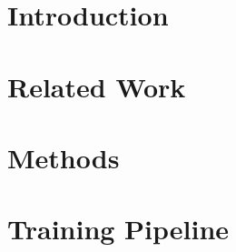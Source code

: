 \documentclass[fleqn,moreauthors,10pt]{ds_report}
\affiliation{\textit{Advisors: Boshko Koloski, Slavko Žitnik}}
\begin{document}
\flushbottom 

\maketitle 

\thispagestyle{empty} 

\section*{Introduction}

\section*{Related Work}

\section*{Methods}





\section*{Training Pipeline}

\end{document}
